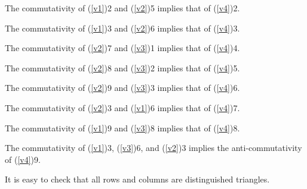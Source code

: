 \documentclass[12pt]{article}
\theoremstyle{remark}
\theoremstyle{definition}
\begin{document}
The commutativity of (\ref{v1})2 and (\ref{v2})5 implies that of (\ref{v4})2. 

The commutativity of (\ref{v1})3 and (\ref{v2})6 implies that of (\ref{v4})3.

The commutativity of (\ref{v2})7 and (\ref{v3})1 implies that of (\ref{v4})4.

The commutativity of (\ref{v2})8 and (\ref{v3})2 implies that of (\ref{v4})5. 

The commutativity of (\ref{v2})9 and (\ref{v3})3 implies that of (\ref{v4})6. 

The commutativity of (\ref{v2})3 and (\ref{v1})6 implies that of (\ref{v4})7. 

The commutativity of (\ref{v1})9 and (\ref{v3})8 implies that of (\ref{v4})8. 

The commutativity of (\ref{v1})3, (\ref{v3})6, and (\ref{v2})3 implies the anti-commutativity of (\ref{v4})9. 

It is easy to check that all rows and columns are distinguished triangles. 
%
%
\end{document}
